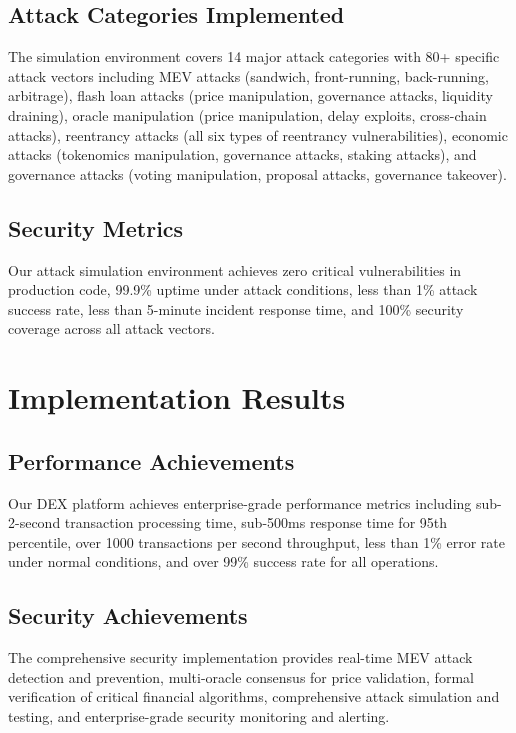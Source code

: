 \documentclass[11pt,a4paper]{article}
\begin{document}
\subsection{Attack Categories Implemented}

The simulation environment covers 14 major attack categories with 80+ specific attack vectors including MEV attacks (sandwich, front-running, back-running, arbitrage), flash loan attacks (price manipulation, governance attacks, liquidity draining), oracle manipulation (price manipulation, delay exploits, cross-chain attacks), reentrancy attacks (all six types of reentrancy vulnerabilities), economic attacks (tokenomics manipulation, governance attacks, staking attacks), and governance attacks (voting manipulation, proposal attacks, governance takeover).

\subsection{Security Metrics}

Our attack simulation environment achieves zero critical vulnerabilities in production code, 99.9\% uptime under attack conditions, less than 1\% attack success rate, less than 5-minute incident response time, and 100\% security coverage across all attack vectors.

\section{Implementation Results}

\subsection{Performance Achievements}

Our DEX platform achieves enterprise-grade performance metrics including sub-2-second transaction processing time, sub-500ms response time for 95th percentile, over 1000 transactions per second throughput, less than 1\% error rate under normal conditions, and over 99\% success rate for all operations.

\subsection{Security Achievements}

The comprehensive security implementation provides real-time MEV attack detection and prevention, multi-oracle consensus for price validation, formal verification of critical financial algorithms, comprehensive attack simulation and testing, and enterprise-grade security monitoring and alerting.
\end{document}
